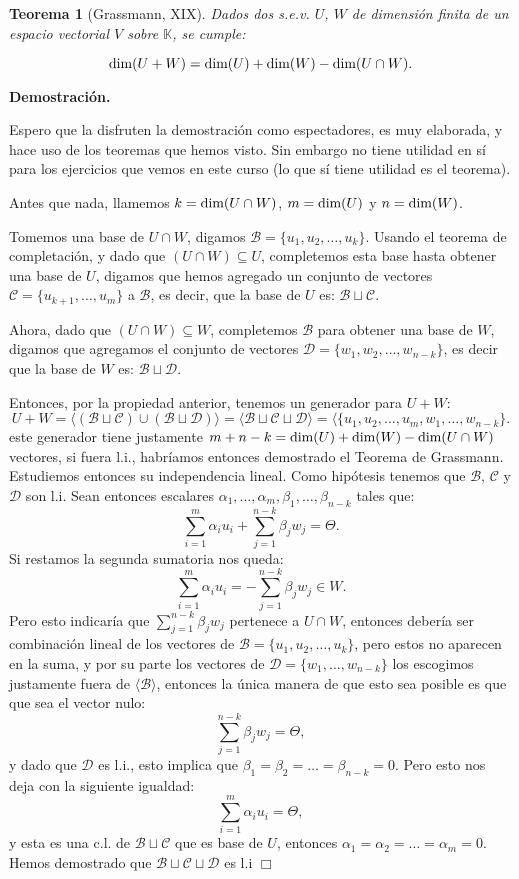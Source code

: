 \documentclass[12pt]{book}
\newtheorem{teo}{Teorema}
\def\K{\mathbb{K}}
\def\B{\mathcal{B}}
\def\D{\mathcal{D}}
\def\Ccal{\mathcal{C}}
\def\dim{\textup{dim}}
\begin{document}
\begin{teo}[Grassmann, XIX]
Dados dos s.e.v. $U$, $W$ de dimensi\'on finita de un espacio vectorial $V$ sobre $\K$, se cumple:

\[ \textup{dim}(U+W)=\textup{dim}(U)+\textup{dim}(W)-\textup{dim}(U\cap W).\]
\end{teo}
{\bf Demostración.} { 
Espero que la disfruten la demostración como espectadores, es muy elaborada, y hace uso de los teoremas que hemos visto. Sin embargo no tiene utilidad en sí para los ejercicios que vemos en este curso (lo que sí tiene utilidad es el teorema).

Antes que nada, llamemos $k=\dim(U\cap W)$, $m=\dim(U)$ y $n=\dim(W)$.

Tomemos una base de $U\cap W$, digamos $\B=\{u_1,u_2,\dots,u_k\}$.
Usando el teorema de completación, y dado que $(U\cap W)\subseteq U$, completemos esta base hasta obtener una base de $U$, digamos que hemos agregado un conjunto de vectores $\Ccal=\{u_{k+1},\dots,u_m\}$ a $\B$, es decir, que la base de $U$ es: $\B\sqcup\Ccal$.

Ahora, dado que $(U\cap W) \subseteq W$, completemos $\B$ para obtener una base de $W$, digamos que agregamos el conjunto de vectores $\D=\{w_1,w_2,\dots,w_{n-k}\}$, es decir que la base de $W$ es: $\B\sqcup\D$.

Entonces, por la propiedad anterior, tenemos un generador para $U+W$:
$$U+W=\langle(\B\sqcup\Ccal)\cup(\B\sqcup\D)\rangle=\langle\B\sqcup\Ccal\sqcup\D\rangle=\langle\{u_1,u_2,\dots,u_m,w_1,\dots,w_{n-k}\}.$$
este generador tiene justamente $m+n-k=\dim(U)+\dim(W)-\dim(U\cap W)$ vectores, si fuera l.i., habríamos entonces demostrado el Teorema de Grassmann.
Estudiemos entonces su independencia lineal.
Como hipótesis tenemos que $\B$, $\Ccal$ y $\D$ son l.i.
Sean entonces escalares $\alpha_1,\dots,\alpha_m,\beta_1,\dots,\beta_{n-k}$ tales que:
$$\sum_{i=1}^m\alpha_i u_i+\sum_{j=1}^{n-k} \beta_j w_j=\Theta.$$
Si restamos la segunda sumatoria nos queda:
$$\sum_{i=1}^m\alpha_i u_i=-\sum_{j=1}^{n-k} \beta_j w_j\in W.$$
Pero esto indicaría que $\sum_{j=1}^{n-k} \beta_j w_j$ pertenece a $U\cap W$, entonces debería ser combinación lineal de los vectores de $\B=\{u_1,u_2,\dots,u_k\}$, pero estos no aparecen en la suma, y por su parte los vectores de $\D=\{w_1,\dots,w_{n-k}\}$ los escogimos justamente fuera de $\langle\B\rangle$, entonces la única manera de que esto sea posible es que que sea el vector nulo:
$$\sum_{j=1}^{n-k} \beta_j w_j=\Theta,$$
y dado que $\D$ es l.i., esto implica que $\beta_1=\beta_2=\dots=\beta_{n-k}=0$.
Pero esto nos deja con la siguiente igualdad:
$$\sum_{i=1}^m\alpha_i u_i=\Theta,$$
y esta es una c.l. de $\B\sqcup\Ccal$ que es base de $U$, entonces $\alpha_1=\alpha_2=\dots=\alpha_m=0$.
Hemos demostrado que $\B\sqcup\Ccal\sqcup\D$ es l.i
\hfill $\Box$
}
\end{document}
